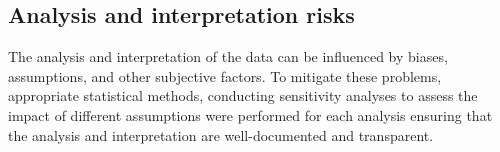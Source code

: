 \subsection{Analysis and interpretation risks} The analysis and interpretation of the data can be influenced by biases, assumptions, and other subjective factors. To mitigate these problems, appropriate statistical methods, conducting sensitivity analyses to assess the impact of different assumptions were performed for each analysis ensuring that the analysis and interpretation are well-documented and transparent.
